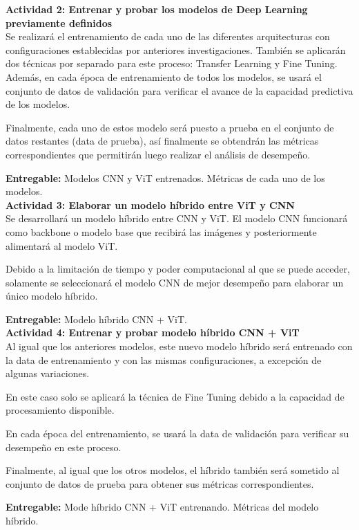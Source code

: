 \textbf{Actividad 2: Entrenar y probar los modelos de Deep Learning previamente definidos}
\\
Se realizará el entrenamiento de cada uno de las diferentes arquitecturas con configuraciones establecidas por anteriores investigaciones. También se aplicarán dos técnicas por separado para este proceso: Transfer Learning y Fine Tuning. Además, en cada época de entrenamiento de todos los modelos, se usará el conjunto de datos de validación para verificar el avance de la capacidad predictiva de los modelos.

Finalmente, cada uno de estos modelo será puesto a prueba en el conjunto de datos restantes (data de prueba), así finalmente se obtendrán las métricas correspondientes que permitirán luego realizar el análisis de desempeño.

\textbf{Entregable:} Modelos CNN y ViT entrenados. Métricas de cada uno de los modelos.
\\

\textbf{Actividad 3:  Elaborar un modelo híbrido entre ViT y CNN}
\\
Se desarrollará un modelo híbrido entre CNN y ViT. El modelo CNN funcionará como backbone o modelo base que recibirá las imágenes y posteriormente alimentará al modelo ViT.

Debido a la limitación de tiempo y poder computacional al que se puede acceder, solamente se seleccionará el modelo CNN de mejor desempeño para elaborar un único modelo híbrido.

\textbf{Entregable:} Modelo híbrido CNN + ViT.
\\

\textbf{Actividad 4: Entrenar y probar modelo híbrido CNN + ViT}
\\
Al igual que los anteriores modelos, este nuevo modelo híbrido será entrenado con la data de entrenamiento y con las mismas configuraciones, a excepción de algunas variaciones.

En este caso solo se aplicará la técnica de Fine Tuning debido a la capacidad de procesamiento disponible.

En cada época del entrenamiento, se usará la data de validación para verificar su desempeño en este proceso.

Finalmente, al igual que los otros modelos, el híbrido también será sometido al conjunto de datos de prueba para obtener sus métricas correspondientes.

\textbf{Entregable:} Mode híbrido CNN + ViT entrenando. Métricas del modelo híbrido.
\\

